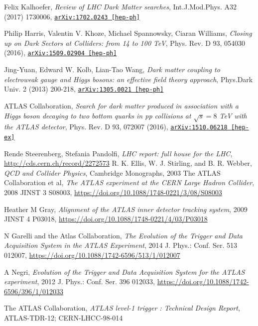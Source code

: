 \documentclass[11pt,a4paper,openright,twoside]{report}
\newcommand{\bibref}[4]{#1, \textit{#2}, #3 #4}
\begin{document}
\begin{thebibliography}{9}
	\bibref{Felix Kalhoefer}{Review of LHC Dark Matter searches}{Int.J.Mod.Phys. A32 (2017) 1730006,}{\href{https://arxiv.org/abs/1702.02430}{\texttt{arXiv:1702.0243 [hep-ph]}}}

	\bibref{Philip Harris, Valentin V. Khoze, Michael Spannowsky, Ciaran Williams}{Closing up on Dark Sectors at Colliders: from 14 to 100 TeV}{Phys. Rev. D 93, 054030 (2016),}{\href{https://arxiv.org/abs/1509.02904}{\texttt{arXiv:1509.02904 [hep-ph]}}}

	\bibref{Jing-Yuan, Edward W. Kolb, Lian-Tao Wang}{Dark matter coupling to electroweak gauge and Higgs bosons: an effective field theory approach}{Phys.Dark Univ. 2 (2013) 200-218,}{\href{https://arxiv.org/abs/1305.0021}{\texttt{arXiv:1305.0021 [hep-ph]}}}

	\bibref{ATLAS Collaboration}{Search for dark matter produced in association with a Higgs boson decaying to two bottom quarks in pp collisions at $\sqrt{s} = 8$ TeV with the ATLAS detector}{Phys. Rev. D 93, 072007 (2016),}{\href{https://arxiv.org/abs/1510.06218}{\texttt{arXiv:1510.06218 [hep-ex]}}}

	\bibref{Rende Steerenberg, Stefania Pandolfi}{LHC report: full house for the LHC}{ \url{http://cds.cern.ch/record/2272573}}
	
	\bibref{R. K. Ellis, W. J. Stirling, and B. R. Webber}{QCD and Collider Physics}{Cambridge Monographs, 2003}

	\bibref{The ATLAS Collaboration et al}{The ATLAS experiment at the CERN Large Hadron Collider}{2008 JINST 3 S08003,}{\url{https://doi.org/10.1088/1748-0221/3/08/S08003}}

	\bibref{Heather M Gray}{Alignment of the ATLAS inner detector tracking system}{2009 JINST 4 P03018,}{\url{https://doi.org/10.1088/1748-0221/4/03/P03018}}

	\bibref{N Garelli and the Atlas Collaboration}{The Evolution of the Trigger and Data Acquisition System in the ATLAS Experiment}{2014 J. Phys.: Conf. Ser. 513 012007,}{\url{https://doi.org/10.1088/1742-6596/513/1/012007}}

	\bibref{A Negri}{Evolution of the Trigger and Data Acquisition System for the ATLAS experiment}{2012 J. Phys.: Conf. Ser. 396 012033,}{\url{https://doi.org/10.1088/1742-6596/396/1/012033}}

	\bibref{The ATLAS Collaboration}{ATLAS level-1 trigger : Technical Design Report}{ATLAS-TDR-12;}{CERN-LHCC-98-014}


\end{thebibliography}
\end{document}
